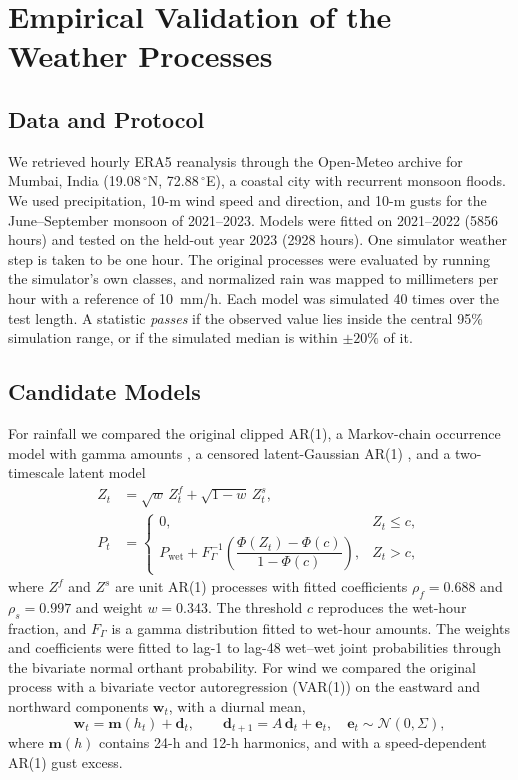 \documentclass{ieeeaccess}
\begin{document}
\section{Empirical Validation of the Weather Processes}
\label{sec:weather}

\subsection{Data and Protocol}
We retrieved hourly ERA5 reanalysis \cite{hersbach2020} through the Open-Meteo archive \cite{zippenfenig2023} for Mumbai, India (19.08\,$^\circ$N, 72.88\,$^\circ$E), a coastal city with recurrent monsoon floods. We used precipitation, 10-m wind speed and direction, and 10-m gusts for the June--September monsoon of 2021--2023. Models were fitted on 2021--2022 (5856 hours) and tested on the held-out year 2023 (2928 hours). One simulator weather step is taken to be one hour. The original processes were evaluated by running the simulator's own classes, and normalized rain was mapped to millimeters per hour with a reference of 10~mm/h. Each model was simulated 40 times over the test length. A statistic \emph{passes} if the observed value lies inside the central 95\% simulation range, or if the simulated median is within $\pm20\%$ of it.

\subsection{Candidate Models}
For rainfall we compared the original clipped AR(1), a Markov-chain occurrence model with gamma amounts \cite{richardson1981}, a censored latent-Gaussian AR(1) \cite{bardossy1992,allcroft2003}, and a two-timescale latent model
\begin{align}
Z_t&=\sqrt{w}\,Z^{f}_t+\sqrt{1-w}\,Z^{s}_t,\nonumber\\
P_t&=\begin{cases}0,& Z_t\le c,\\[2pt] P_{\mathrm{wet}}+F_\Gamma^{-1}\!\left(\dfrac{\Phi(Z_t)-\Phi(c)}{1-\Phi(c)}\right),& Z_t>c,\end{cases}
\label{eq:rain2}
\end{align}
where $Z^f$ and $Z^s$ are unit AR(1) processes with fitted coefficients $\rho_f=0.688$ and $\rho_s=0.997$ and weight $w=0.343$. The threshold $c$ reproduces the wet-hour fraction, and $F_\Gamma$ is a gamma distribution fitted to wet-hour amounts. The weights and coefficients were fitted to lag-1 to lag-48 wet--wet joint probabilities through the bivariate normal orthant probability. For wind we compared the original process with a bivariate vector autoregression (VAR(1)) on the eastward and northward components $\mathbf{w}_t$, with a diurnal mean,
\begin{equation}
\mathbf{w}_t=\mathbf{m}(h_t)+\mathbf{d}_t,\qquad \mathbf{d}_{t+1}=A\,\mathbf{d}_t+\mathbf{e}_t,\quad \mathbf{e}_t\sim\mathcal{N}(0,\Sigma),
\label{eq:var}
\end{equation}
where $\mathbf{m}(h)$ contains 24-h and 12-h harmonics, and with a speed-dependent AR(1) gust excess.
\end{document}
